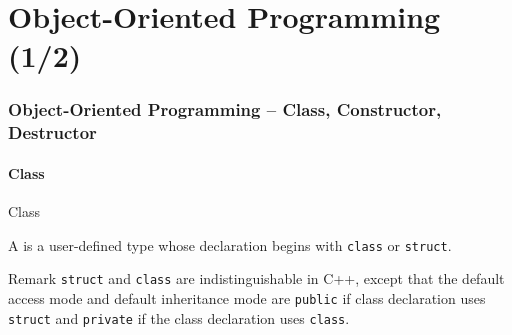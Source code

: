 \part{Object-Oriented Programming (1/2)}
\label{part:oop1}

\section{Object-Oriented Programming -- Class, Constructor, Destructor}

\subsection{Class}

\begin{frame}{Class}{}
  \begin{definition}[Class]
    A  is a user-defined type whose declaration begins with \lstinline!class! or \lstinline!struct!.
  \end{definition}

  \begin{block}{Remark}
    \lstinline!struct! and \lstinline!class! are indistinguishable in C++, except that the default access mode and default inheritance mode are \lstinline!public! if class declaration uses \lstinline!struct! and \lstinline!private! if the class declaration uses \lstinline!class!.
  \end{block}
\end{frame}


